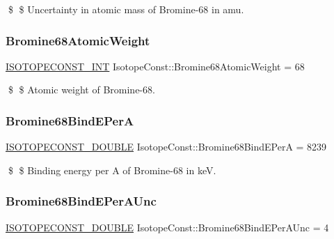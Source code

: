 \$ \$ Uncertainty in atomic mass of Bromine-\/68 in amu. \mbox{\label{group___isotope_const-_bromine-_br68_ga089fa444b905da13662524fe869a8fba}} 
\subsubsection{\texorpdfstring{Bromine68\+Atomic\+Weight}{Bromine68AtomicWeight}}
{\footnotesize\ttfamily \mbox{\hyperlink{group___isotope_const-_macros_ga5f18360b3e99483a35c32d789e62621c}{I\+S\+O\+T\+O\+P\+E\+C\+O\+N\+S\+T\+\_\+\+I\+NT}} Isotope\+Const\+::\+Bromine68\+Atomic\+Weight = 68}

\$ \$ Atomic weight of Bromine-\/68. \mbox{\label{group___isotope_const-_bromine-_br68_gabae3c26c50c263c7d678b2599871a28f}} 
\subsubsection{\texorpdfstring{Bromine68\+Bind\+E\+PerA}{Bromine68BindEPerA}}
{\footnotesize\ttfamily \mbox{\hyperlink{group___isotope_const-_macros_ga8f45a7272ce02c0b4c65c44636ed719a}{I\+S\+O\+T\+O\+P\+E\+C\+O\+N\+S\+T\+\_\+\+D\+O\+U\+B\+LE}} Isotope\+Const\+::\+Bromine68\+Bind\+E\+PerA = 8239}

\$ \$ Binding energy per A of Bromine-\/68 in keV. \mbox{\label{group___isotope_const-_bromine-_br68_ga873ce4bbdcadbf16a58d5c4d8313ad8c}} 
\subsubsection{\texorpdfstring{Bromine68\+Bind\+E\+Per\+A\+Unc}{Bromine68BindEPerAUnc}}
{\footnotesize\ttfamily \mbox{\hyperlink{group___isotope_const-_macros_ga8f45a7272ce02c0b4c65c44636ed719a}{I\+S\+O\+T\+O\+P\+E\+C\+O\+N\+S\+T\+\_\+\+D\+O\+U\+B\+LE}} Isotope\+Const\+::\+Bromine68\+Bind\+E\+Per\+A\+Unc = 4}

